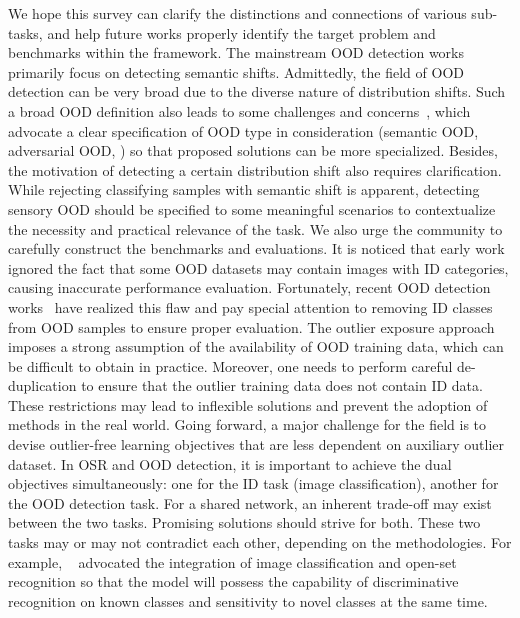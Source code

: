 We hope this survey can clarify the distinctions and connections of various sub-tasks, and help future works properly identify the target problem and benchmarks within the framework. The mainstream OOD detection works primarily focus on detecting semantic shifts.
Admittedly, the field of OOD detection can be very broad due to the diverse nature of distribution shifts. 
Such a broad OOD definition also leads to some challenges and concerns~, which advocate a clear specification of OOD type in consideration (\eg semantic OOD, adversarial OOD, \etc) so that proposed solutions can be more specialized.
Besides, the motivation of detecting a certain distribution shift also requires clarification. While rejecting classifying samples with semantic shift is apparent, detecting sensory OOD should be specified to some meaningful scenarios to contextualize the necessity and practical relevance of the task. 
We also urge the community to carefully construct the benchmarks and evaluations. It is noticed that early work~ ignored the fact that some OOD datasets may contain images with ID categories, causing inaccurate performance evaluation. 
Fortunately, recent OOD detection works~
have realized this flaw and pay special attention to removing ID classes from OOD samples to ensure proper evaluation. 
The outlier exposure approach~ imposes a strong assumption of the availability of  OOD  training data,  which can be difficult to obtain in practice. Moreover, one needs to perform careful de-duplication to ensure that the outlier training data does not contain ID data. These restrictions may lead to inflexible solutions and prevent the adoption of methods in the real world. Going forward, a major challenge for the field is to devise outlier-free learning objectives that are less dependent on auxiliary outlier dataset. 
In OSR and OOD detection, it is important to achieve the dual objectives simultaneously: one for the ID task (\eg image classification), another for the OOD detection task. For a shared network, an inherent trade-off may exist between the two tasks. Promising solutions should strive for both. These two tasks may or may not contradict each other, depending on the methodologies. For example, ~ advocated the integration of image classification and open-set recognition so that the model will possess the capability of discriminative recognition on known classes and sensitivity to novel classes at the same time.

